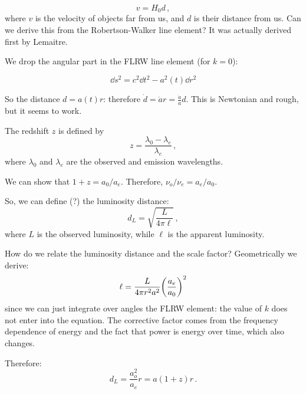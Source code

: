 \documentclass[main.tex]{subfiles}
\begin{document}
\begin{equation}
  v = H_0 d\,,
\end{equation}
%
where \(v\) is the velocity of objects far from us, and \(d\) is their distance from us. Can we derive this from the Robertson-Walker line element?
It was actually derived first by Lemaitre.

We drop the angular part in the FLRW line element (for \(k = 0\)):

\begin{equation}
  \dd{s^2} = c^2 \dd{t^2} - a^2(t) \dd{r^2}
\end{equation}

So the distance \(d = a(t) r\): therefore \(\dot{d} = \dot{a}r = \frac{\dot{a} }{a} d\).   This is Newtonian and rough, but it seems to work.

\begin{definition}[Redshift]
    The redshift \(z\) is defined by
    \begin{equation}
      z = \frac{\lambda_0 - \lambda_e}{\lambda_{e}}\,,
    \end{equation}
    where \(\lambda_0\) and \(\lambda_e\) are the observed and emission wavelengths.
\end{definition}

We can show that \(1+z = a_0/ a_e\). Therefore, \(\nu_o / \nu_e = a_e / a_0\).

So, we can define (?) the luminosity distance:
%
\begin{equation}
  d_L = \sqrt{\frac{L}{4 \pi \ell} } \,,
\end{equation}
%
where \(L\) is the observed luminosity, while \(\ell\) is the apparent luminosity.

How do we relate the luminosity distance and the scale factor? Geometrically we derive:
%
\begin{equation}
  \ell = \frac{L}{4 \pi r^2 a^2} \qty(\frac{a_e}{a_0}) ^2
\end{equation}
%
since we can just integrate over angles the FLRW element: the value of \(k\) does not enter into the equation.
The corrective factor comes from the frequency dependence of energy and the fact that power is energy over time, which also changes.

Therefore:
%
\begin{equation}
  d_L = \frac{a_o^2}{a_e} r = a (1+z) r\,.
\end{equation}
\end{document}
